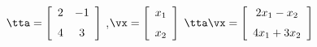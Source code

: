 {$\tta = \left[ \begin {array}{cc} 2&-1\\ \noalign{\medskip}4&3\end {array} \right]$
,\quad $\vx = \left[ \begin {array}{c} x_1\\\noalign{\medskip}x_2\end {array} \right] $}
{$\tta\vx= \left[ \begin {array}{c}2x_1-x_2\\\noalign{\medskip}4x_1+3x_2\end {array} \right] $
}
 
 

 

 

